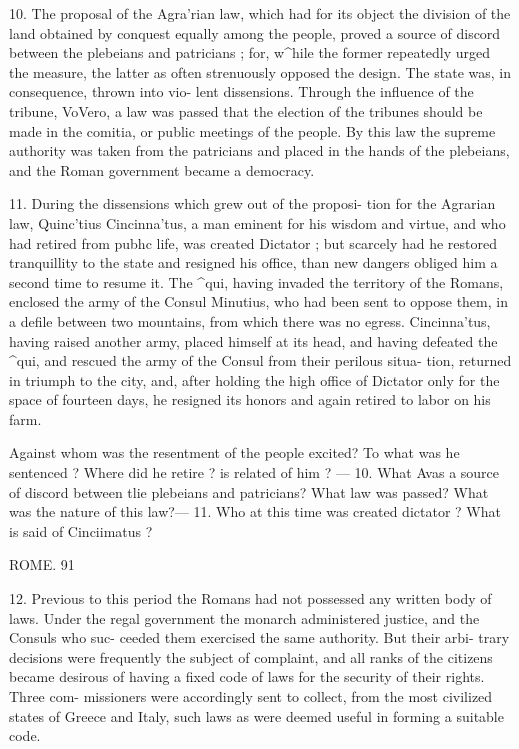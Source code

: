 \documentclass[openany,a4paper]{memoir}
\begin{document}
{10. The proposal of the Agra'rian law, which had for its 
object the division of the land obtained by conquest equally 
among the people, proved a source of discord between the 
plebeians and patricians ; for, w^hile the former repeatedly 
urged the measure, the latter as often strenuously opposed 
the design. The state was, in consequence, thrown into vio- 
lent dissensions. Through the influence of the tribune, 
VoVero, a law was passed that the election of the tribunes 
should be made in the comitia, or public meetings of the 
people. By this law the supreme authority was taken from 
the patricians and placed in the hands of the plebeians, and 
the Roman government became a democracy. 

11. During the dissensions which grew out of the proposi- 
tion for the Agrarian law, Quinc'tius Cincinna'tus, a man 
eminent for his wisdom and virtue, and who had retired from 
pubhc life, was created Dictator ; but scarcely had he restored 
tranquillity to the state and resigned his office, than new 
dangers obliged him a second time to resume it. The ^qui, 
having invaded the territory of the Romans, enclosed the 
army of the Consul Minutius, who had been sent to oppose 
them, in a defile between two mountains, from which there 
was no egress. Cincinna'tus, having raised another army, 
placed himself at its head, and having defeated the ^qui, 
and rescued the army of the Consul from their perilous situa- 
tion, returned in triumph to the city, and, after holding the 
high office of Dictator only for the space of fourteen days, he 
resigned its honors and again retired to labor on his farm. 

Against whom was the resentment of the people excited? To what 
was he sentenced ? Where did he retire ? \Vhat is related of him ? — 
10. What Avas a source of discord between tlie plebeians and patricians? 
What law was passed? What was the nature of this law?— 11. Who 
at this time was created dictator ? What is said of Cinciimatus ? 



ROME. 91 

12. Previous to this period the Romans had not possessed 
any written body of laws. Under the regal government 
the monarch administered justice, and the Consuls who suc- 
ceeded them exercised the same authority. But their arbi- 
trary decisions were frequently the subject of complaint, and 
all ranks of the citizens became desirous of having a fixed 
code of laws for the security of their rights. Three com- 
missioners were accordingly sent to collect, from the most 
civilized states of Greece and Italy, such laws as were deemed 
useful in forming a suitable code. 

}
\end{document}
